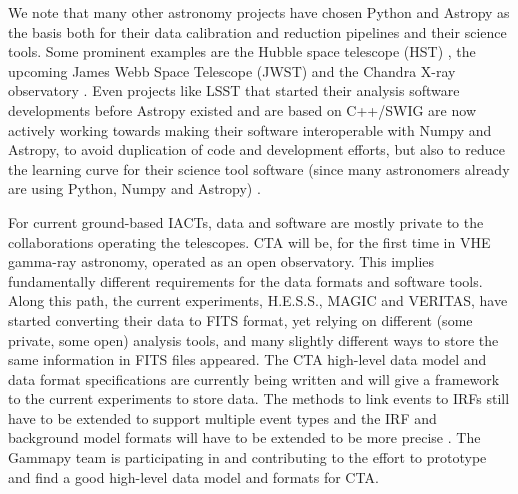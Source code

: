 \documentclass{PoS}
\begin{document}
We note that many other astronomy projects have chosen Python and Astropy as the
basis both for their data calibration and reduction pipelines and their science
tools. Some prominent examples are the Hubble space telescope (HST)
\cite{hubble}, the upcoming James Webb Space Telescope (JWST) \cite{jwst} and
the Chandra X-ray observatory \cite{sherpa2001, chandra}. Even projects like
LSST that started their analysis software developments before Astropy existed
and are based on C++/SWIG are now actively working towards making their software
interoperable with Numpy and Astropy, to avoid duplication of code and
development efforts, but also to reduce the learning curve for their science
tool software (since many astronomers already are using Python, Numpy and
Astropy) \cite{lsst}.



For current ground-based IACTs, data and software are mostly private to the
collaborations operating the telescopes. CTA will be, for the first time in VHE
gamma-ray astronomy, operated as an open observatory. This implies fundamentally
different requirements for the data formats and software tools. Along this path,
the current experiments, H.E.S.S., MAGIC and VERITAS, have started converting
their data to FITS format, yet relying on different (some private, some open)
analysis tools, and many slightly different ways to store the same information in
FITS files appeared. The CTA high-level data model and data format specifications 
are currently being written and will give a framework to the current experiments
to store data. The methods to link events to IRFs still have to be extended to 
support multiple event types and the IRF and background model formats will have to be 
extended to be more precise \cite{opendata}. The Gammapy team is participating 
in and contributing to the effort to prototype and find a good high-level data 
model and formats for CTA.
\end{document}
